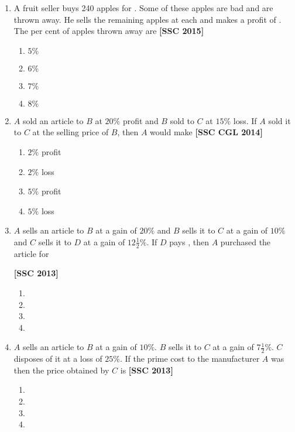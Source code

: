 \documentclass[twocolumn]{article}
\begin{document}
\begin{enumerate}
        \item A fruit seller buys 240 apples for . Some of these apples are bad and are thrown away. He sells the remaining apples at  each and makes a profit of . The per cent of apples thrown away are \hfill {\bf[SSC 2015]}
            \begin{enumerate}
                \item $5 \%$
                \item $6 \%$
                \item $7 \%$
                \item $8 \%$
            \end{enumerate}
            
        \item $A$ sold an article to $B$ at $20 \%$ profit and $B$ sold to $C$ at $15 \%$ loss. If $A$ sold it to $C$ at the selling price of $B$, then $A$ would make \hfill {\bf[SSC CGL 2014]}
            \begin{enumerate}
                \item $2 \%$ profit
                \item $2 \%$ loss
                \item $5 \%$ profit
                \item $5 \%$ loss
            \end{enumerate}
            
        \item $A$ sells an article to $B$ at a gain of $20 \%$ and $B$ sells it to $C$ at a gain of $10 \%$ and $C$ sells it to $D$ at a gain of $12 \frac{1}{2} \%$. If $D$ pays , then $A$ purchased the article for \\ \strut\hfill {\bf[SSC 2013]}
            \begin{enumerate}
                \item {}
                \item {}
                \item {}
                \item {}
            \end{enumerate}
            
        \item $A$ sells an article to $B$ at a gain of $10 \%$. $B$ sells it to $C$ at a gain of $7 \frac{1}{2} \%$. $C$ disposes of it at a loss of $25 \%$. If the prime cost to the manufacturer $A$ was  then the price obtained by $C$ is \hfill {\bf[SSC 2013]}
            \begin{enumerate}
                \item {}
                \item {}
                \item {}
                \item {}
            \end{enumerate}
            

\end{enumerate}
\end{document}

